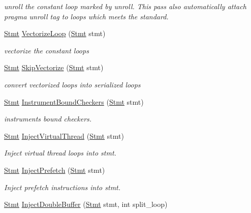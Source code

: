 \begin{DoxyCompactItemize}
\begin{DoxyCompactList}\small\item\em unroll the constant loop marked by unroll. This pass also automatically attach pragma unroll tag to loops which meets the standard. \end{DoxyCompactList}\item 
\hyperlink{classtvm_1_1tir_1_1Stmt}{Stmt} \hyperlink{namespacetvm_1_1tir_abdd6d56877b9dd03803f433352b09060}{Vectorize\+Loop} (\hyperlink{classtvm_1_1tir_1_1Stmt}{Stmt} stmt)
\begin{DoxyCompactList}\small\item\em vectorize the constant loops \end{DoxyCompactList}\item 
\hyperlink{classtvm_1_1tir_1_1Stmt}{Stmt} \hyperlink{namespacetvm_1_1tir_a2f8fc7370ebc9a6b0de19ae9e597576f}{Skip\+Vectorize} (\hyperlink{classtvm_1_1tir_1_1Stmt}{Stmt} stmt)
\begin{DoxyCompactList}\small\item\em convert vectorized loops into serialized loops \end{DoxyCompactList}\item 
\hyperlink{classtvm_1_1tir_1_1Stmt}{Stmt} \hyperlink{namespacetvm_1_1tir_a604c5a3e5e7fad62a912b1d3bb41c3fa}{Instrument\+Bound\+Checkers} (\hyperlink{classtvm_1_1tir_1_1Stmt}{Stmt} stmt)
\begin{DoxyCompactList}\small\item\em instruments bound checkers. \end{DoxyCompactList}\item 
\hyperlink{classtvm_1_1tir_1_1Stmt}{Stmt} \hyperlink{namespacetvm_1_1tir_a8c9c2135e4a2a674c7ffe1f414d9b362}{Inject\+Virtual\+Thread} (\hyperlink{classtvm_1_1tir_1_1Stmt}{Stmt} stmt)
\begin{DoxyCompactList}\small\item\em Inject virtual thread loops into stmt. \end{DoxyCompactList}\item 
\hyperlink{classtvm_1_1tir_1_1Stmt}{Stmt} \hyperlink{namespacetvm_1_1tir_a1d45de8cf5b6053ab16dde307a00238d}{Inject\+Prefetch} (\hyperlink{classtvm_1_1tir_1_1Stmt}{Stmt} stmt)
\begin{DoxyCompactList}\small\item\em Inject prefetch instructions into stmt. \end{DoxyCompactList}\item 
\hyperlink{classtvm_1_1tir_1_1Stmt}{Stmt} \hyperlink{namespacetvm_1_1tir_abde051e07d9c7ba41d5676ce64208766}{Inject\+Double\+Buffer} (\hyperlink{classtvm_1_1tir_1_1Stmt}{Stmt} stmt, int split\+\_\+loop)

\end{DoxyCompactItemize}
